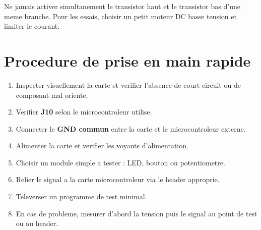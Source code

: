 \documentclass[11pt,a4paper]{article}
\begin{document}
\begin{warningbox}
Ne jamais activer simultanement le transistor haut et le transistor bas d'une meme branche. Pour les essais, choisir un petit moteur DC basse tension et limiter le courant.
\end{warningbox}

\section{Procedure de prise en main rapide}
\begin{enumerate}
\item Inspecter visuellement la carte et verifier l'absence de court-circuit ou de composant mal oriente.
\item Verifier \textbf{J10} selon le microcontroleur utilise.
\item Connecter le \textbf{GND commun} entre la carte et le microcontroleur externe.
\item Alimenter la carte et verifier les voyants d'alimentation.
\item Choisir un module simple a tester : LED, bouton ou potentiometre.
\item Relier le signal a la carte microcontroleur via le header approprie.
\item Televerser un programme de test minimal.
\item En cas de probleme, mesurer d'abord la tension puis le signal au point de test ou au header.
\end{enumerate}
\end{document}
